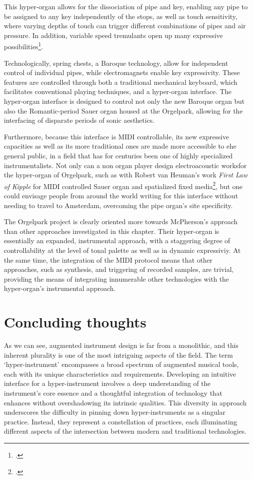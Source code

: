 \documentclass[12pt,twoside,maitrise]{dms_ks}
\theoremstyle{definition}
\begin{document}
{This hyper-organ allows for the dissociation of pipe and key, enabling any pipe to be assigned to any key independently of the stops, as well as touch sensitivity, where varying depths of touch can trigger different combinations of pipes and air pressure.
In addition, variable speed tremulants open up many expressive possibilities\footcite[19--29]{fidom_digital_2014}.

Technologically, spring chests, a Baroque technology, allow for independent control of individual pipes, while electromagnets enable key expressivity. 
These features are controlled through both a traditional mechanical keyboard, which facilitates conventional playing techniques, and a hyper-organ interface. 
The hyper-organ interface is designed to control not only the new Baroque organ but also the Romantic-period Sauer organ housed at the Orgelpark, allowing for the interfacing of disparate periods of sonic aesthetics. 

Furthermore, because this interface is MIDI controllable, its new expressive capacities as well as its more traditional ones are made more accessible to ehe general public, in a field that has for centuries been one of highly specialized instrumentalists. Not only can a non organ player design electroacoustic worksfor the hyper-organ of Orgelpark, such as with Robert van Heuman's work \textit{First Law of Kipple} for MIDI controlled Sauer organ and spatialized fixed media\footcite[190]{van_heumen_new_2014}, but one could envisage people from around the world writing for this interface without needing to travel to Amsterdam, overcoming the pipe organ's site specificity.

The Orgelpark project is clearly oriented more towards McPherson's approach than other approaches investigated in this chapter.
Their hyper-organ is essentially an expanded, instrumental approach, with a staggering degree of controllability at the level of tonal palette as well as in dynamic expressiviy.
At the same time, the integration of the MIDI protocol means that other approaches, such as synthesis, and triggering of recorded samples, are trivial, providing the means of integrating innumerable other technologies with the hyper-organ's instrumental approach.

\section{Concluding thoughts}

As we can see, augmented instrument design is far from a monolithic, and this inherent plurality is one of the most intriguing aspects of the field.
The term `hyper-instrument' encompasses a broad spectrum of augmented musical tools, each with its unique characteristics and requirements.
Developing an intuitive interface for a hyper-instrument involves a deep understanding of the instrument's core essence and a thoughtful integration of technology that enhances without overshadowing its intrinsic qualities.
This diversity in approach underscores the difficulty in pinning down hyper-instruments as a singular practice.
Instead, they represent a constellation of practices, each illuminating different aspects of the intersection between modern and traditional technologies.

}
\end{document}
